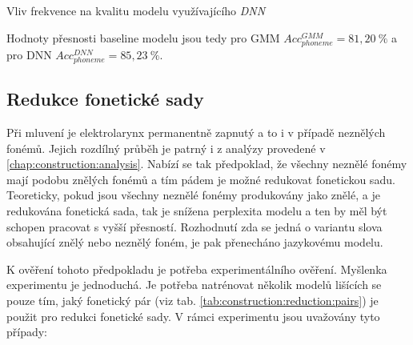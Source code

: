 

\begin{table}[htpb]
  \centering
  \def\arraystretch{1.5}
  \caption{Vliv frekvence na kvalitu modelu využívajícího \textit{DNN} }
  \label{tab:construction:experiment:dnn}
\end{table}

Hodnoty přesnosti baseline modelu jsou tedy pro GMM $Acc_{phoneme}^{GMM} = 81,20\ \%$ a pro DNN $Acc_{phoneme}^{DNN} = 85,23\ \%$.

\subsection{Redukce fonetické sady}
\label{chap:construction:results:reduction}

Při mluvení je elektrolarynx permanentně zapnutý a to i v případě neznělých fonémů. Jejich rozdílný průběh je patrný i z analýzy provedené v \ref{chap:construction:analysis}. Nabízí se tak předpoklad, že všechny neznělé fonémy mají podobu znělých fonémů a tím pádem je možné redukovat fonetickou sadu. Teoreticky, pokud jsou všechny neznělé fonémy produkovány jako znělé, a je redukována fonetická sada, tak je snížena perplexita modelu a ten by měl být schopen pracovat s vyšší přesností. Rozhodnutí zda se jedná o variantu slova obsahující znělý nebo neznělý foném, je pak přenecháno jazykovému modelu.

K ověření tohoto předpokladu je potřeba experimentálního ověření. Myšlenka experimentu je jednoduchá. Je potřeba natrénovat několik modelů lišících se pouze tím, jaký fonetický pár (viz tab. \ref{tab:construction:reduction:pairs}) je použit pro redukci fonetické sady. V rámci experimentu jsou uvažovány tyto případy:

